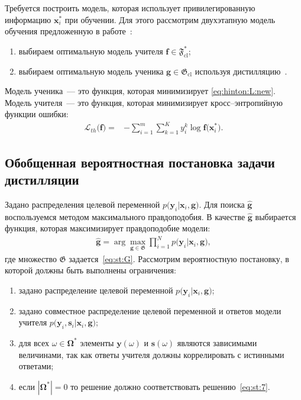 Требуется построить модель, которая использует привилегированную информацию $\mathbf{x}^*_i$ при обучении. Для этого рассмотрим двухэтапную модель обучения предложенную в работе~\cite{Lopez2016}:
\begin{enumerate}
    \item выбираем оптимальную модель учителя $\mathbf{f} \in \mathfrak{F}_{\text{cl}}^*$;
    \item выбираем оптимальную модель ученика $\mathbf{g} \in \mathfrak{G}_{\text{cl}}$ используя дистилляцию~\cite{Hinton2015}. 
\end{enumerate}

Модель ученика~--- это функция, которая минимизирует \eqref{eq:hinton:L:new}. Модель учителя~--- это функция, которая минимизирует кросс--энтропийную функции ошибки:
\[
\label{eq:hinton.2}
\begin{aligned}
   \mathcal{L}_{th}\bigr(\mathbf{f}\bigr) = &-\sum_{i=1}^{m}{{\sum_{k=1}^{K}y^k_i\log\mathbf{f}\bigr(\mathbf{x}^*_i\bigr)}}.
   \end{aligned}
\]

\subsection{Обобщенная вероятностная постановка задачи дистилляции}

Задано распределения целевой переменной $p\bigr(\mathbf{y}_i|\mathbf{x}_i, \mathbf{g}\bigr)$.
Для поиска $\hat{\mathbf{g}}$ воспользуемся методом максимального правдоподобия. В качестве $\hat{\mathbf{g}}$ выбирается функция, которая максимизирует правдоподобие модели:
\[
\label{eq:st:7}
\begin{aligned}
\hat{\mathbf{g}} = \arg\max_{\mathbf{g}\in \mathfrak{G}} \prod_{i=1}^{N}p\bigr(\mathbf{y}_{i}|\mathbf{x}_i, \mathbf{g}\bigr),
\end{aligned}
\]
где множество $\mathfrak{G}$ задается~\eqref{eq:st:G}.
Рассмотрим вероятностную постановку, в которой должны быть выполнены ограничения:
\begin{enumerate}
	\item задано распределение целевой переменной $p\bigr(\mathbf{y}_i|\mathbf{x}_i, \mathbf{g}\bigr)$;
	\item задано совместное распределение целевой переменной и ответов модели учителя $p\bigr(\mathbf{y}_i, \mathbf{s}_i|\mathbf{x}_i, \mathbf{g}\bigr)$;
	\item для всех $\omega \in \bm{\Omega}^*$ элементы $\mathbf{y}(\omega)$ и $\mathbf{s}(\omega)$ являются зависимыми величинами, так как ответы учителя должны коррелировать с истинными ответами;
	\item если $|\bm{\Omega}^*|=0$ то решение должно соответствовать решению~\eqref{eq:st:7}.
\end{enumerate}


